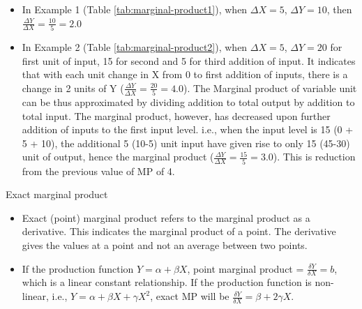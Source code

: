 \documentclass[12pt,ignorenonframetext,aspectratio=169]{beamer}
\providecommand{\tightlist}{%
  \setlength{\itemsep}{0pt}\setlength{\parskip}{0pt}}
\begin{document}
\begin{frame}{}
\protect\hypertarget{section-13}{}

\begin{itemize}
\tightlist
\item
  In Example 1 (Table \ref{tab:marginal-product1}), when
  \(\Delta X = 5\), \(\Delta Y = 10\), then
  \(\frac{\Delta Y}{\Delta X} = \frac{10}{5} = 2.0\)
\item
  In Example 2 (Table \ref{tab:marginal-product2}), when
  \(\Delta X = 5\), \(\Delta Y = 20\) for first unit of input, 15 for
  second and 5 for third addition of input. It indicates that with each
  unit change in X from 0 to first addition of inputs, there is a change
  in 2 units of Y (\(\frac{\Delta Y}{\Delta X} = \frac{20}{5} = 4.0\)).
  The Marginal product of variable unit can be thus approximated by
  dividing addition to total output by addition to total input. The
  marginal product, however, has decreased upon further addition of
  inputs to the first input level. i.e., when the input level is 15 (0 +
  5 + 10), the additional 5 (10-5) unit input have given rise to only 15
  (45-30) unit of output, hence the marginal product
  (\(\frac{\Delta Y}{\Delta X} = \frac{15}{5} = 3.0\)). This is
  reduction from the previous value of MP of 4.
\end{itemize}

\end{frame}

\begin{frame}{Exact marginal product}
\protect\hypertarget{exact-marginal-product}{}

\begin{itemize}
\item
  Exact (point) marginal product refers to the marginal product as a
  derivative. This indicates the marginal product of a point. The
  derivative gives the values at a point and not an average between two
  points.
\item
  If the production function \(Y = \alpha + \beta X\), point marginal
  product = \(\frac{\delta Y}{\delta X} = b\), which is a linear
  constant relationship. If the production function is non-linear, i.e.,
  \(Y = \alpha + \beta X + \gamma X^2\), exact MP will be
  \(\frac{\delta Y}{\delta X} = \beta + 2\gamma X\).
\end{itemize}

\end{frame}
\end{document}
